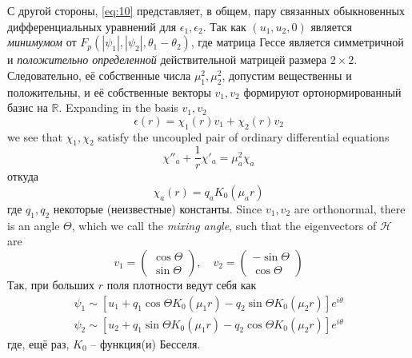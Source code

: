 С другой стороны, \eqref{eq:10} представляет, в общем, пару связанных 
обыкновенных дифференциальных уравнений для \( \epsilon_1, \epsilon_2 \). Так 
как \( (u_1, u_2, 0 ) \) является \textit{минимумом} от 
\( F_p(|\psi_1|, |\psi_2|, \theta_1 - \theta_2) \), где матрица Гессе является  
симметричной и \textit{положительно определенной} действительной матрицей 
размера \( 2\times2 \). Следовательно, её собственные числа 
\( \mu_1^2, \mu_2^2\), допустим вещественны и положительны, и её собственные 
векторы \( v_1, v_2 \) формируют ортонормированный базис на \( \mathbb{R} \). 
Expanding in the basis \( v_1, v_2 \)
\begin{equation}
    \epsilon(r) = \chi_1(r) v_1 + \chi_2(r) v_2
    \label{eq:17}
\end{equation}
we see that \( \chi_1, \chi_2 \) satisfy the uncoupled pair of ordinary 
differential equations
\begin{equation}
    \chi''_a + \frac{1}{r}\chi'_a = \mu_a^2 \chi_a
    \label{eq:18}
\end{equation}
откуда
\begin{equation}
    \chi_a(r) = q_a K_0(\mu_a r)
    \label{eq:19}
\end{equation}
где \( q_1, q_2 \) некоторые (неизвестные) константы. Since \( v_1, v_2 \) are 
orthonormal, there is an angle \( \Theta \), which we call the \emph{mixing 
angle}, such that the eigenvectors of \( \mathcal{H} \) are
\begin{equation}
    v_1 = \left( \begin{array}{c}
        \cos\Theta \\
        \sin\Theta
    \end{array} \right), \quad
    v_2 = \left( \begin{array}{c}
        -\sin\Theta \\
        \cos\Theta
    \end{array} \right)
    \label{eq:20}
\end{equation}
Так, при больших \( r \) поля плотности ведут себя как 
\begin{gather}
    \psi_1 \sim \left[ u_1 + q_1\cos\Theta K_0(\mu_1 r) - 
        q_2\sin\Theta K_0(\mu_2 r) \right]e^{i\theta} \nonumber \\
    \psi_2 \sim \left[ u_2 + q_1\sin\Theta K_0(\mu_1 r) - 
        q_2\cos\Theta K_0(\mu_2 r) \right]e^{i\theta}
    \label{eq:21}
\end{gather}
где, ещё раз, \( K_0 \) -- функция(и) Бесселя.

